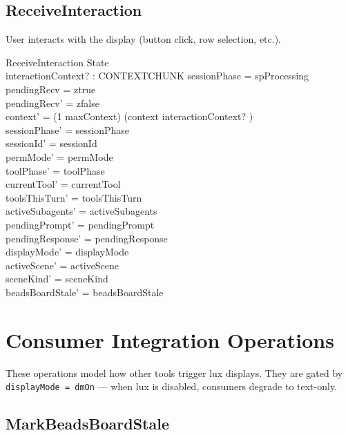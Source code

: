 \documentclass[a4paper,10pt,fleqn]{article}
\begin{document}
\subsection{ReceiveInteraction}

User interacts with the display (button click, row selection, etc.).

\begin{schema}{ReceiveInteraction}
  \Delta State \\
  interactionContext? : CONTEXTCHUNK
  \where
  sessionPhase = spProcessing \\
  pendingRecv = ztrue \\
  pendingRecv' = zfalse \\
  context' = (1 \upto maxContext) \dres (context \cat \langle interactionContext? \rangle) \\
  sessionPhase' = sessionPhase \\
  sessionId' = sessionId \\
  permMode' = permMode \\
  toolPhase' = toolPhase \\
  currentTool' = currentTool \\
  toolsThisTurn' = toolsThisTurn \\
  activeSubagents' = activeSubagents \\
  pendingPrompt' = pendingPrompt \\
  pendingResponse' = pendingResponse \\
  displayMode' = displayMode \\
  activeScene' = activeScene \\
  sceneKind' = sceneKind \\
  beadsBoardStale' = beadsBoardStale
\end{schema}

\section{Consumer Integration Operations}

These operations model how other tools trigger lux displays.
They are gated by \texttt{displayMode = dmOn} --- when lux is
disabled, consumers degrade to text-only.

\subsection{MarkBeadsBoardStale}
\end{document}
